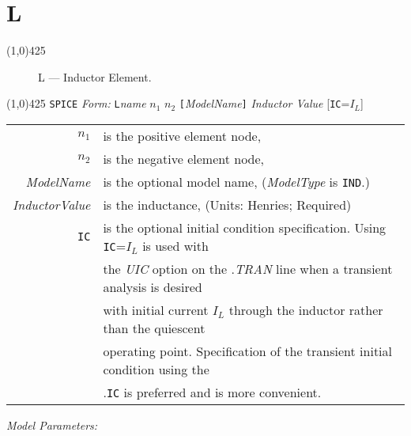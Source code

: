 
\oddsidemargin 10mm \topmargin 0.0in \textwidth 5.5in \textheight
7.375in \evensidemargin 1.0in \headheight 0.18in \footskip 0.16in
%
\section[L \- Inductor]{ \hspace{107mm}\huge \textbf{L}}
\linethickness{1mm} \line(1,0){425} \normalsize
\begin{figure}[h]
\centerline{\epsfxsize=1in} \caption{L ---
Inductor Element.}
\end{figure}
\newline
\linethickness{0.5mm} \line(1,0){425}
\newline
\texttt{SPICE} \textit{Form:}
\newline
\texttt{L}\textit{name} $n_1$ $n_2$
\texttt{[}\textit{ModelName}\texttt{]} \textit{Inductor Value}
[\texttt{IC}=$I_L$]
\newline
\newline
\begin{tabular}{r l}
$n_1$ & is the positive element node, \\
$n_2$ & is the negative element node, \\
\textit{ModelName} & is the optional model name, (\textit{ModelType} is \texttt{IND}.)\\
\textit{InductorValue} & is the inductance, (Units: Henries; Required) \\
\texttt{IC}  & is the optional initial condition specification. Using \texttt{IC}=$I_L$ is used with \\
             & the \textit{UIC} option on the .\textit{TRAN} line when a transient analysis is desired  \\
             & with initial current $I_L$ through the inductor rather than the quiescent  \\
             & operating point. Specification of  the transient initial condition using the  \\
             & .\texttt{IC} is preferred and is more convenient.
\end{tabular}
\newline
\textit{Model Parameters:}
\newline

